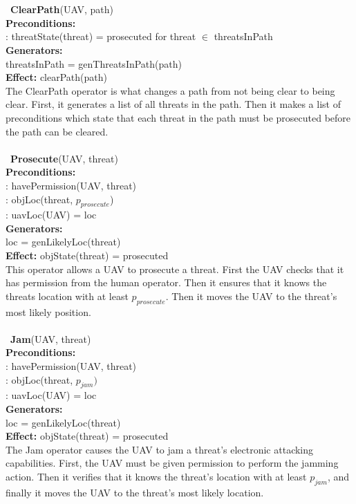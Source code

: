 \documentclass[12pt]{article}
\begin{document}
\\\
\\\
\textbf{ClearPath}(UAV, path) \\
\textbf{Preconditions:} \\
: threatState(threat) = prosecuted for threat $\in$ threatsInPath\\
\textbf{Generators:} \\
\indent threatsInPath = genThreatsInPath(path) \\
\textbf{Effect:} clearPath(path) \\
The ClearPath operator is what changes a path from not being clear to being clear. First, it generates a list of all threats in the path. Then it makes a list of preconditions which state that each threat in the path must be prosecuted before the path can be cleared.
\\\
\\\
\textbf{Prosecute}(UAV, threat) \\
\textbf{Preconditions:} \\
: havePermission(UAV, threat) \\
: objLoc(threat, $p_{prosecute}$) \\
\indent 2: uavLoc(UAV) = loc \\
\textbf{Generators:} \\
\indent loc = genLikelyLoc(threat) \\
\textbf{Effect:} objState(threat) = prosecuted \\
This operator allows a UAV to prosecute a threat. First the UAV checks that it has permission from the human operator. Then it ensures that it knows the threats location with at least $p_{prosecute}$. Then it moves the UAV to the threat's most likely position.
\\\
\\\
\textbf{Jam}(UAV, threat) \\
\textbf{Preconditions:} \\
\indent 0: havePermission(UAV, threat) \\
\indent 1: objLoc(threat, $p_{jam})$ \\
: uavLoc(UAV) = loc \\
\textbf{Generators:} \\
\indent loc = genLikelyLoc(threat) \\
\textbf{Effect:} objState(threat) = prosecuted \\
The Jam operator causes the UAV to jam a threat's electronic attacking capabilities. First, the UAV must be given permission to perform the jamming action. Then it verifies that it knows the threat's location with at least $p_{jam}$, and finally it moves the UAV to the threat's most likely location.
\end{document}
